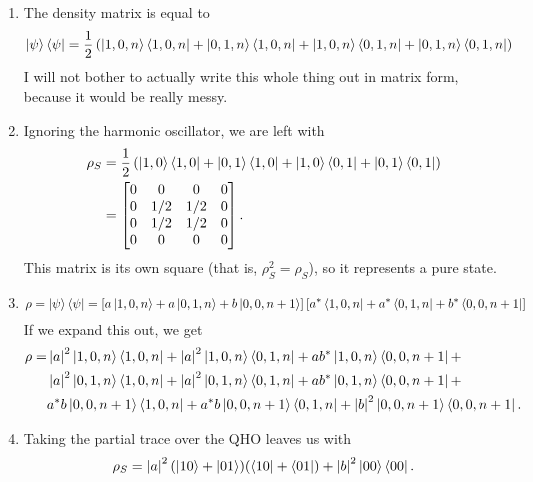 \documentclass{article}
\begin{document}
\bigskip
\begin{prob}
\end{prob}
\begin{enumerate}[label=(\alph*)]
    \item The density matrix is equal to \begin{align*}
            \ket{\psi}\bra{\psi} &= \frac{1}{2} \left( \ket{1,0,n}\bra{1,0,n} + \ket{0,1,n}\bra{1,0,n} + \ket{1,0,n}\bra{0,1,n} + \ket{0,1,n}\bra{0,1,n} \right) 
    \end{align*}
    I will not bother to actually write this whole thing out in matrix form, because it would be really messy.
    \item Ignoring the harmonic oscillator, we are left with
        \begin{align*}
            \rho_S &= \frac{1}{2} \left( \ket{1,0}\bra{1,0} + \ket{0,1}\bra{1,0} + \ket{1,0}\bra{0,1} + \ket{0,1}\bra{0,1} \right) \\
                   &= \begin{bmatrix}
                       0 & 0 & 0 & 0 \\
                       0 & 1/2 & 1/2 & 0 \\
                       0 & 1/2 & 1/2 & 0 \\
                       0 & 0 & 0 & 0
                   \end{bmatrix}.
        \end{align*}
        This matrix is its own square (that is, $\rho_S^2=\rho_S$), so it represents a pure state.
    \item
        \[ \rho = \ket{\psi}\bra{\psi} = \left[ a \ket{1,0,n} + a \ket{0,1,n} + b \ket{0,0,n+1} \right] \left[ a^* \bra{1,0,n} + a^* \bra{0,1,n} + b^* \bra{0,0,n+1} \right] \]
        If we expand this out, we get \begin{align*}
            \rho =& \abs{a}^2 \ket{1,0,n}\bra{1,0,n} + \abs{a}^2 \ket{1,0,n}\bra{0,1,n} + a b^* \ket{1,0,n}\bra{0,0,n+1} + \\
                    & \abs{a}^2 \ket{0,1,n}\bra{1,0,n} + \abs{a}^2 \ket{0,1,n}\bra{0,1,n} + a b^* \ket{0,1,n} \bra{0,0,n+1} + \\
                    & a^*b \ket{0,0,n+1}\bra{1,0,n} + a^*b \ket{0,0,n+1} \bra{0,1,n} + \abs{b}^2 \ket{0,0,n+1}\bra{0,0,n+1}.
        \end{align*}
    \item Taking the partial trace over the QHO leaves us with
    \[ \rho_S = \abs{a}^2 ( \ket{10} + \ket{01}) (\bra{10} + \bra{01}) + \abs{b}^2 \ket{00}\bra{00}. \]

\end{enumerate}
\end{document}
